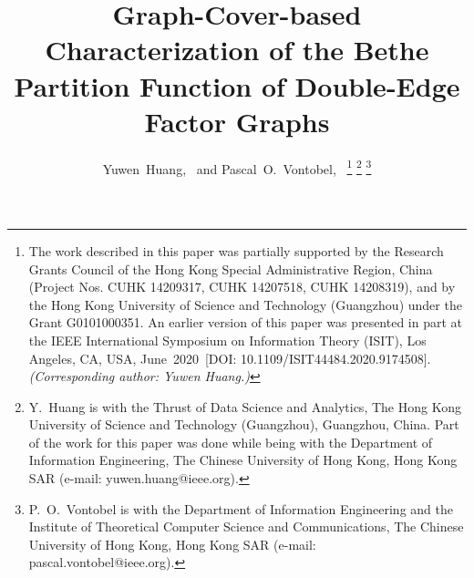 \documentclass[journal]{IEEEtran}
\begin{document}
\title{Graph-Cover-based Characterization of the Bethe Partition Function of Double-Edge Factor Graphs}

\author{Yuwen~Huang,~
  and Pascal~O.~Vontobel,~
  \thanks{
    The work described in this paper was partially supported by the Research Grants Council of the Hong Kong Special Administrative Region, China (Project Nos. CUHK 14209317, CUHK 14207518, CUHK 14208319), and by the Hong Kong University of Science and Technology (Guangzhou) under the Grant G0101000351.
    An earlier version of this paper was presented in part at the IEEE International Symposium on Information Theory (ISIT), Los Angeles, CA, USA, June~2020~[DOI: 10.1109/ISIT44484.2020.9174508].
    \textit{(Corresponding author: Yuwen Huang.)}
  }
  \thanks{Y.~Huang is with the
    Thrust of Data Science and Analytics,
    The Hong Kong University of Science and Technology (Guangzhou),
    Guangzhou, China.
    Part of the work for this paper was done while being with the Department of Information Engineering, The Chinese University of Hong Kong, Hong Kong SAR
    (e-mail: yuwen.huang@ieee.org).}%
  \thanks{P.~O.~Vontobel is with the
    Department of Information Engineering and
    the Institute of Theoretical Computer Science and Communications,
    The Chinese University of Hong Kong, Hong Kong SAR
    (e-mail: pascal.vontobel@ieee.org).}%
}

\maketitle
\end{document}
